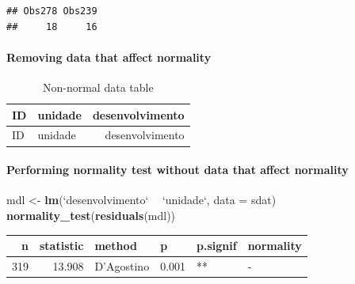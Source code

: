 \documentclass[]{article}
\newenvironment{Shaded}{\begin{snugshade}}{\end{snugshade}}
\newcommand{\CommentTok}[1]{\textcolor[rgb]{0.56,0.35,0.01}{\textit{#1}}}
\newcommand{\DataTypeTok}[1]{\textcolor[rgb]{0.13,0.29,0.53}{#1}}
\newcommand{\KeywordTok}[1]{\textcolor[rgb]{0.13,0.29,0.53}{\textbf{#1}}}
\newcommand{\NormalTok}[1]{#1}
\newcommand{\OperatorTok}[1]{\textcolor[rgb]{0.81,0.36,0.00}{\textbf{#1}}}
\newcommand{\StringTok}[1]{\textcolor[rgb]{0.31,0.60,0.02}{#1}}
\let\oldparagraph\paragraph
\renewcommand{\paragraph}[1]{\oldparagraph{#1}\mbox{}}
\begin{document}
\begin{verbatim}
## Obs278 Obs239 
##     18     16
\end{verbatim}

\hypertarget{removing-data-that-affect-normality}{%
\paragraph{Removing data that affect
normality}\label{removing-data-that-affect-normality}}

\begin{Shaded}
\end{Shaded}

\begin{longtable}[]{@{}llr@{}}
\caption{Non-normal data table}\tabularnewline
\toprule
ID & unidade & desenvolvimento\tabularnewline
\midrule
\endfirsthead
\toprule
ID & unidade & desenvolvimento\tabularnewline
\midrule
\endhead
\bottomrule
\end{longtable}

\hypertarget{performing-normality-test-without-data-that-affect-normality}{%
\paragraph{Performing normality test without data that affect
normality}\label{performing-normality-test-without-data-that-affect-normality}}

\begin{Shaded}
\begin{Highlighting}[]
\NormalTok{mdl <-}\StringTok{ }\KeywordTok{lm}\NormalTok{(}\StringTok{`}\DataTypeTok{desenvolvimento}\StringTok{`} \OperatorTok{~}\StringTok{ `}\DataTypeTok{unidade}\StringTok{`}\NormalTok{, }\DataTypeTok{data =}\NormalTok{ sdat)}
\KeywordTok{normality_test}\NormalTok{(}\KeywordTok{residuals}\NormalTok{(mdl))}
\end{Highlighting}
\end{Shaded}

\begin{longtable}[]{@{}rrllll@{}}
\toprule
n & statistic & method & p & p.signif & normality\tabularnewline
\midrule
\endhead
319 & 13.908 & D'Agostino & 0.001 & ** & -\tabularnewline
\bottomrule
\end{longtable}
\end{document}
